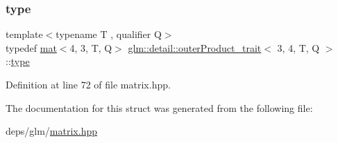 \subsubsection{\texorpdfstring{type}{type}}
{\footnotesize\ttfamily template$<$typename T , qualifier Q$>$ \\
typedef \hyperlink{structglm_1_1mat}{mat}$<$4, 3, T, Q$>$ \hyperlink{structglm_1_1detail_1_1outerProduct__trait}{glm\+::detail\+::outer\+Product\+\_\+trait}$<$ 3, 4, T, Q $>$\+::\hyperlink{structglm_1_1mat_3_014_00_013_00_01T_00_01Q_01_4}{type}}



Definition at line 72 of file matrix.\+hpp.



The documentation for this struct was generated from the following file\+:\begin{DoxyCompactItemize}
\item 
deps/glm/\hyperlink{matrix_8hpp}{matrix.\+hpp}\end{DoxyCompactItemize}
